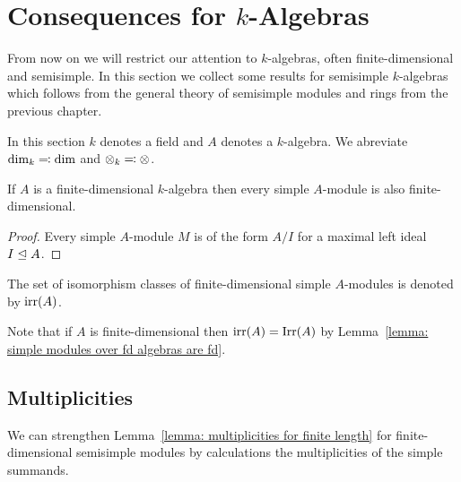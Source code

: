 \section{Consequences for \texorpdfstring{$k$}{k}-Algebras}


\begin{fluff}
  From now on we will restrict our attention to $k$-algebras, often finite-dimensional and semisimple.
  In this section we collect some results for semisimple $k$-algebras which follows from the general theory of semisimple modules and rings from the previous chapter.
\end{fluff}


\begin{conventions}
  In this section $k$ denotes a field and $A$ denotes a $k$-algebra.
  We abreviate $\dim_k \eqqcolon \dim$ and $\mathbin{\otimes}_k \eqqcolon \mathbin{\otimes}$.
\end{conventions}


\begin{lemma}
  \label{lemma: simple modules over fd algebras are fd}
  If $A$ is a finite-dimensional $k$-algebra then every simple $A$-module is also finite-dimensional.
\end{lemma}


\begin{proof}
  Every simple $A$-module $M$ is of the form $A/I$ for a maximal left ideal $I \trianglelefteq A$.
\end{proof}


\begin{notation}
  The set of isomorphism classes of finite-dimensional simple $A$-mod\-ules is denoted by $\operatorname{irr}(A)$.
\end{notation}


\begin{fluff}
  Note that if $A$ is finite-dimensional then $\operatorname{irr}(A) = \operatorname{Irr}(A)$ by Lemma~\ref{lemma: simple modules over fd algebras are fd}.
\end{fluff}





\subsection*{Multiplicities}


\begin{fluff}
  We can strengthen Lemma~\ref{lemma: multiplicities for finite length} for finite-dimensional semisimple modules by calculations the multiplicities of the simple summands.
\end{fluff}


